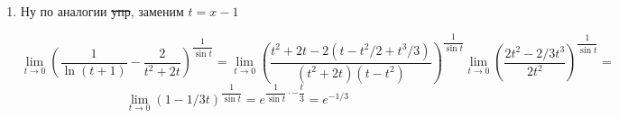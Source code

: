 \documentclass{report}
\begin{document}
\begin{enumerate}
\item
Ну по аналогии \sout{упр}, заменим $t=x-1$

\[
\lim\limits_{t\to0}\left(\dfrac{1}{\ln (t+1)}-\dfrac{2}{t^2+2t}\right)^{\dfrac{1}{\sin t}}=
\lim\limits_{t\to0}\left(\dfrac{t^2+2t-2(t-t^2/2+t^3/3)}{(t^2+2t)(t-t^2)}\right)^{\dfrac{1}{\sin t}}
\lim\limits_{t\to0}\left(\dfrac{2t^2-2/3t^3}{2t^2}\right)^{\dfrac{1}{\sin t}}=
\]
\[
\lim\limits_{t\to0}\left( 1-1/3t\right)^{\dfrac{1}{\sin t}}=e^{\dfrac{1}{\sin t}\cdot-\dfrac{t}{3}}=e^{-1/3}
\]
\end{enumerate}
\end{document}
